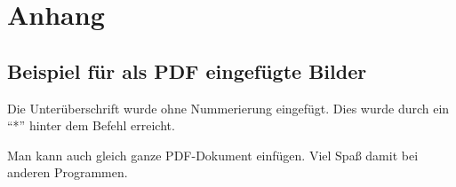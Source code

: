 \newpage
\section{Anhang}
\subsection*{Beispiel für als PDF eingefügte Bilder}

Die Unterüberschrift wurde ohne Nummerierung eingefügt. Dies wurde durch ein ``*'' hinter dem  Befehl erreicht.

Man kann auch gleich ganze PDF-Dokument einfügen. Viel Spaß damit bei anderen Programmen. \Winkey

